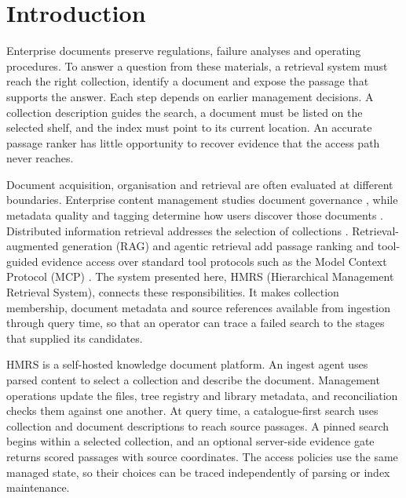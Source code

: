 \section{Introduction}
\label{sec:intro}

Enterprise documents preserve regulations, failure analyses and operating
procedures. To answer a question from these materials, a retrieval system
must reach the right collection, identify a document and expose the passage
that supports the answer. Each step depends on earlier management decisions.
A collection description guides the search, a document must be listed on
the selected shelf, and the index must point to its current location.
An accurate passage ranker has little opportunity to recover evidence that
the access path never reaches.

Document acquisition, organisation and retrieval are often evaluated at
different boundaries. Enterprise content management studies document
governance \cite{paivarinta-ecm-2005,tyrvaainen-ecm-2006}, while metadata
quality and tagging determine how users discover those documents
\cite{park-metadata-quality-2009,golder-tagging-2006}. Distributed
information retrieval addresses the selection of collections
\cite{callan1995searching,si2003redde}. Retrieval-augmented generation
(RAG) and agentic retrieval add passage ranking and tool-guided evidence
access over standard tool protocols such as the Model Context Protocol
(MCP) \cite{rag-lewis,dpr,modular-rag,mcp,gao-rag-survey-2023}.
The system presented here, HMRS (Hierarchical Management Retrieval
System), connects these responsibilities. It makes collection membership,
document metadata and source references available from ingestion through
query time, so that an operator can trace a failed search to the stages
that supplied its candidates.

HMRS is a self-hosted
knowledge document platform. An ingest agent uses parsed content to select
a collection and describe the document. Management operations update the
files, tree registry and library metadata, and reconciliation checks them
against one another. At query time, a catalogue-first search uses collection
and document descriptions to reach source passages. A pinned search begins
within a selected collection, and an optional server-side evidence gate
returns scored passages with source coordinates. The access policies use the
same managed state, so their choices can be traced independently of parsing
or index maintenance.

